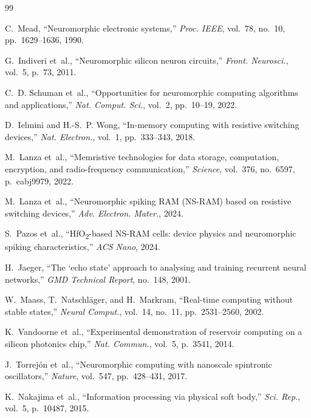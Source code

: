 \documentclass[11pt]{article}
\begin{document}
\begin{thebibliography}{99}

C.~Mead, ``Neuromorphic electronic systems,''
\textit{Proc. IEEE}, vol.~78, no.~10, pp.~1629--1636, 1990.

G.~Indiveri et~al., ``Neuromorphic silicon neuron circuits,''
\textit{Front. Neurosci.}, vol.~5, p.~73, 2011.

C.~D. Schuman et~al., ``Opportunities for neuromorphic computing
algorithms and applications,''
\textit{Nat. Comput. Sci.}, vol.~2, pp.~10--19, 2022.

D.~Ielmini and H.-S.~P. Wong, ``In-memory computing with
resistive switching devices,''
\textit{Nat. Electron.}, vol.~1, pp.~333--343, 2018.

M.~Lanza et~al., ``Memristive technologies for data storage,
computation, encryption, and radio-frequency communication,''
\textit{Science}, vol.~376, no.~6597, p.~eabj9979, 2022.

M.~Lanza et~al., ``Neuromorphic spiking RAM (NS-RAM) based on
resistive switching devices,''
\textit{Adv. Electron. Mater.}, 2024.

S.~Pazos et~al., ``HfO\textsubscript{2}-based NS-RAM cells:
device physics and neuromorphic spiking characteristics,''
\textit{ACS Nano}, 2024.

H.~Jaeger, ``The `echo state' approach to analysing and training
recurrent neural networks,''
\textit{GMD Technical Report}, no.~148, 2001.

W.~Maass, T.~Natschl{\"a}ger, and H.~Markram,
``Real-time computing without stable states,''
\textit{Neural Comput.}, vol.~14, no.~11, pp.~2531--2560, 2002.

K.~Vandoorne et~al., ``Experimental demonstration of reservoir
computing on a silicon photonics chip,''
\textit{Nat. Commun.}, vol.~5, p.~3541, 2014.

J.~Torrej{\'o}n et~al., ``Neuromorphic computing with nanoscale
spintronic oscillators,''
\textit{Nature}, vol.~547, pp.~428--431, 2017.

K.~Nakajima et~al., ``Information processing via physical soft
body,''
\textit{Sci. Rep.}, vol.~5, p.~10487, 2015.


\end{thebibliography}
\end{document}
